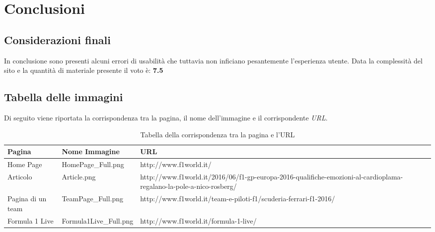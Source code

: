 \section{Conclusioni}

\subsection{Considerazioni finali}

In conclusione sono presenti alcuni errori di usabilità che tuttavia non
inficiano pesantemente l'esperienza utente. Data la complessità del sito
e la quantità di materiale presente il voto è: \textbf{7.5}

\subsection{Tabella delle immagini}

Di seguito viene riportata la corrispondenza tra la pagina, il nome
dell'immagine e il corrispondente \textit{URL}.

\begin{center}
  \begin{table}[H]
    \centering
    \begin{tabular}{| p{3cm} | p{4cm} | p{8cm} |}
      \hline
      \textbf{Pagina} & \textbf{Nome Immagine} & \textbf{URL} \tabularnewline \hline
		Home Page         & HomePage\_Full.png     & http://www.f1world.it/ \tabularnewline \hline
		Articolo          & Article.png            & http://www.f1world.it/2016/06/f1-gp-europa-2016-qualifiche-emozioni-al-cardioplama-regalano-la-pole-a-nico-rosberg/  \tabularnewline \hline
		Pagina di un team & TeamPage\_Full.png     & http://www.f1world.it/team-e-piloti-f1/scuderia-ferrari-f1-2016/  \tabularnewline \hline
		Formula 1 Live    & Formula1Live\_Full.png & http://www.f1world.it/formula-1-live/ \tabularnewline \hline
    \end{tabular}
    \caption{Tabella della corrispondenza tra la pagina e l'URL}
  \end{table}
\end{center}
